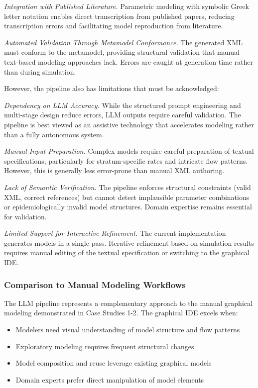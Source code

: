 \textit{Integration with Published Literature.} Parametric modeling with symbolic Greek letter notation enables direct transcription from published papers, reducing transcription errors and facilitating model reproduction from literature.

\textit{Automated Validation Through Metamodel Conformance.} The generated XML must conform to the metamodel, providing structural validation that manual text-based modeling approaches lack. Errors are caught at generation time rather than during simulation.

However, the pipeline also has limitations that must be acknowledged:

\textit{Dependency on LLM Accuracy.} While the structured prompt engineering and multi-stage design reduce errors, LLM outputs require careful validation. The pipeline is best viewed as an assistive technology that accelerates modeling rather than a fully autonomous system.

\textit{Manual Input Preparation.} Complex models require careful preparation of textual specifications, particularly for stratum-specific rates and intricate flow patterns. However, this is generally less error-prone than manual XML authoring.

\textit{Lack of Semantic Verification.} The pipeline enforces structural constraints (valid XML, correct references) but cannot detect implausible parameter combinations or epidemiologically invalid model structures. Domain expertise remains essential for validation.

\textit{Limited Support for Interactive Refinement.} The current implementation generates models in a single pass. Iterative refinement based on simulation results requires manual editing of the textual specification or switching to the graphical IDE.

\subsubsection{Comparison to Manual Modeling Workflows}

The LLM pipeline represents a complementary approach to the manual graphical modeling demonstrated in Case Studies 1-2. The graphical IDE excels when:
\begin{itemize}
    \item Modelers need visual understanding of model structure and flow patterns
    \item Exploratory modeling requires frequent structural changes
    \item Model composition and reuse leverage existing graphical models
    \item Domain experts prefer direct manipulation of model elements
\end{itemize}

